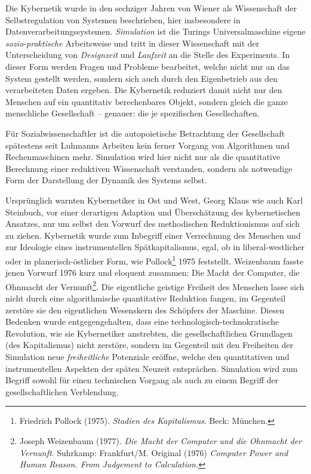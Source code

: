 \documentclass[a4paper,11pt]{article}
\begin{document}
Die Kybernetik wurde in den sechziger Jahren von Wiener als Wissenschaft der
Selbstregulation von Systemen beschrieben, hier insbesondere in
Datenverarbeitungssystemen. \emph{Simulation} ist die Turings
Universalmaschine eigene \emph{sozio-praktische} Arbeitsweise und tritt in
dieser Wissenschaft mit der Unterscheidung von \emph{Designzeit} und
\emph{Laufzeit} an die Stelle des Experiments. In dieser Form werden Fragen
und Probleme bearbeitet, welche nicht nur an das System gestellt werden,
sondern sich auch durch den Eigenbetrieb aus den verarbeiteten Daten
ergeben. Die Kybernetik reduziert damit nicht nur den Menschen auf ein
quantitativ berechenbares Objekt, sondern gleich die ganze menschliche
Gesellschaft -- genauer: die je spezifischen Gesellschaften.

Für Sozialwissenschaftler ist die autopoietische Betrachtung der Gesellschaft
spätestens seit Luhmanns Arbeiten kein ferner Vorgang von Algorithmen und
Rechenmaschinen mehr. Simulation wird hier nicht nur als die quantitative
Berechnung einer reduktiven Wissenschaft verstanden, sondern als notwendige
Form der Darstellung der Dynamik des Systems selbst.

Ursprünglich warnten Kybernetiker in Ost und West, Georg Klaus wie auch Karl
Steinbuch, vor einer derartigen Adaption und Überschätzung des kybernetischen
Ansatzes, nur um selbst den Vorwurf des methodischen Reduktionismus auf sich
zu ziehen. Kybernetik wurde zum Inbegriff einer Verrechnung des Menschen und
zur Ideologie eines instrumentellen Spätkapitalismus, egal, ob in
liberal-westlicher oder in planerisch-östlicher Form, wie
Pollock\footnote{Friedrich Pollock (1975). \emph{Stadien des
    Kapitalismus}. Beck: München. } 1975 feststellt. Weizenbaum fasste jenen
Vorwurf 1976 kurz und eloquent zusammen: Die Macht der Computer, die Ohnmacht
der Vernunft\footnote{Joseph Weizenbaum (1977). \emph{Die Macht der Computer
    und die Ohnmacht der Vernunft}.  Suhrkamp: Frankfurt/M. Original (1976)
  \emph{Computer Power and Human Reason. From Judgement to Calculation.}  }.
Die eigentliche geistige Freiheit des Menschen lasse sich nicht durch eine
algorithmische quantitative Reduktion fangen, im Gegenteil zerstöre sie den
eigentlichen Wesenskern des Schöpfers der Maschine.  Diesen Bedenken wurde
entgegengehalten, dass eine technologisch-technokratische Revolution, wie sie
Kybernetiker anstrebten, die gesellschaftlichen Grundlagen (des Kapitalismus)
nicht zerstöre, sondern im Gegenteil mit den Freiheiten der Simulation neue
\emph{freiheitliche} Potenziale eröffne, welche den quantitativen und
instrumentellen Aspekten der späten Neuzeit entsprächen. Simulation wird zum
Begriff sowohl für einen technischen Vorgang als auch zu einem Begriff der
gesellschaftlichen Verblendung.
\end{document}
